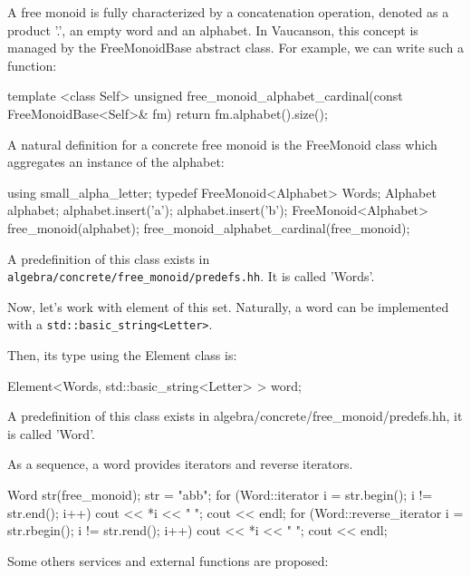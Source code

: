 \documentclass{article}
\begin{document}
A free monoid is fully characterized by a concatenation operation,
denoted as a product '.', an empty word and an alphabet. In Vaucanson,
this concept is managed by the FreeMonoidBase abstract class. For
example, we can write such a function:

\begin{code}
template <class Self>
unsigned free_monoid_alphabet_cardinal(const FreeMonoidBase<Self>& fm)
{
  return fm.alphabet().size();
}
\end{code}

A natural definition for a concrete free monoid is the FreeMonoid
class which aggregates an instance of the alphabet:

\begin{code}
{
  using small_alpha_letter;
  typedef FreeMonoid<Alphabet>  Words;
  Alphabet     alphabet;
  alphabet.insert('a');
  alphabet.insert('b');
  FreeMonoid<Alphabet> free_monoid(alphabet);
  free_monoid_alphabet_cardinal(free_monoid);
}
\end{code}

A predefinition of this class exists in
\verb!algebra/concrete/free_monoid/predefs.hh!. It is called 'Words'.

Now, let's work with element of this set. Naturally, a word can be
implemented with a \verb!std::basic_string<Letter>!.

Then, its type using the Element class is:

\begin{code}
{
  Element<Words, std::basic_string<Letter> > word;
}
\end{code}

A predefinition of this class exists in
algebra/concrete/free\_monoid/predefs.hh, it is called 'Word'.

As a sequence, a word provides iterators and reverse iterators. 

\begin{code}
  Word str(free_monoid);
  str = "abb";
  for (Word::iterator i = str.begin(); i != str.end(); i++)
    cout << *i << " ";
  cout << endl;
  for (Word::reverse_iterator i = str.rbegin(); i != str.rend(); i++)
    cout << *i << " ";
  cout << endl;
\end{code}

Some others services and external functions are proposed:
\end{document}
